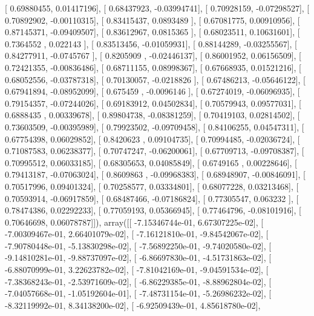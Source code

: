 \documentclass{article}
\begin{document}
       [ 0.69880455,  0.01417196],
       [ 0.68437923, -0.03994741],
       [ 0.70928159, -0.07298527],
       [ 0.70892902, -0.00110315],
       [ 0.83415437,  0.0893489 ],
       [ 0.67081775,  0.00910956],
       [ 0.87145371, -0.09409507],
       [ 0.83612967,  0.0815365 ],
       [ 0.68023511,  0.10631601],
       [ 0.7364552 ,  0.022143  ],
       [ 0.83513456, -0.01059931],
       [ 0.88144289, -0.03255567],
       [ 0.84277911, -0.0745767 ],
       [ 0.8205909 , -0.02446137],
       [ 0.86001952,  0.06156509],
       [ 0.72421355, -0.00836486],
       [ 0.68711155,  0.08998367],
       [ 0.67668935,  0.01521216],
       [ 0.68052556, -0.03787318],
       [ 0.70130057, -0.0218826 ],
       [ 0.67486213, -0.05646122],
       [ 0.67941894, -0.08952099],
       [ 0.675459  , -0.0096146 ],
       [ 0.67274019, -0.06096935],
       [ 0.79154357, -0.07244026],
       [ 0.69183912,  0.04502834],
       [ 0.70579943,  0.09577031],
       [ 0.6888435 ,  0.00339678],
       [ 0.89804738, -0.08381259],
       [ 0.70419103,  0.02814502],
       [ 0.73603509, -0.00395989],
       [ 0.79923502, -0.09709458],
       [ 0.84106255,  0.04547311],
       [ 0.67754398,  0.06029852],
       [ 0.8420623 ,  0.09104735],
       [ 0.70994485, -0.02036724],
       [ 0.71087583,  0.06238377],
       [ 0.70747247, -0.06200061],
       [ 0.67709713, -0.09708387],
       [ 0.70995512,  0.06033185],
       [ 0.68305653,  0.04085849],
       [ 0.6749165 ,  0.00228646],
       [ 0.79413187, -0.07063024],
       [ 0.8609863 , -0.09968383],
       [ 0.68948907, -0.00846091],
       [ 0.70517996,  0.09401324],
       [ 0.70258577,  0.03334801],
       [ 0.68077228,  0.03213468],
       [ 0.70593914, -0.06917859],
       [ 0.68487466, -0.07186824],
       [ 0.77305547,  0.063232  ],
       [ 0.78474386,  0.02292233],
       [ 0.77059193,  0.05366945],
       [ 0.77464796, -0.08101916],
       [ 0.70646698,  0.06078787]]), array([[ -7.15346744e-01,   6.67307225e-02],
       [ -7.00309467e-01,   2.66401079e-02],
       [ -7.16121810e-01,  -9.84542067e-02],
       [ -7.90780448e-01,  -5.13830298e-02],
       [ -7.56892250e-01,  -9.74020580e-02],
       [ -9.14810281e-01,  -9.88737097e-02],
       [ -6.86697830e-01,  -4.51731863e-02],
       [ -6.88070999e-01,   3.22623782e-02],
       [ -7.81042169e-01,  -9.04591534e-02],
       [ -7.38368243e-01,  -2.53971609e-02],
       [ -6.86229385e-01,  -8.88962804e-02],
       [ -7.04057668e-01,  -1.05192604e-01],
       [ -7.48731154e-01,  -5.26986232e-02],
       [ -8.32119992e-01,   8.34138200e-02],
       [ -6.92509439e-01,   4.85618780e-02],
\end{document}
